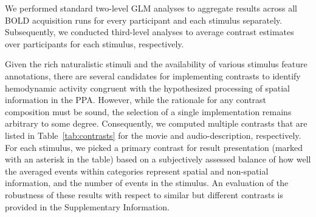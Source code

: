 \documentclass[english,11pt]{article}
\begin{document}
We performed standard two-level GLM analyses to aggregate results across all
BOLD acquisition runs for every participant and each stimulus separately.
Subsequently, we conducted third-level analyses to average contrast estimates
over participants for each stimulus, respectively.

Given the rich naturalistic stimuli and the availability of various stimulus
feature annotations, there are several candidates for implementing contrasts to
identify hemodynamic activity congruent with the hypothesized processing of
spatial information in the PPA.
However, while the rationale for any contrast composition must be sound, the
selection of a single implementation remains arbitrary to some degree.
Consequently, we computed multiple contrasts that are listed in
Table~\ref{tab:contrasts} for the movie and audio-description, respectively.
For each stimulus, we picked a primary contrast for result presentation (marked
with an asterisk in the table) based on a subjectively assessed balance of how well
the averaged events within categories represent spatial and non-spatial
information, and the number of events in the stimulus.
An evaluation of the robustness of these results with respect to similar but
different contrasts is provided in the Supplementary Information.
\end{document}
